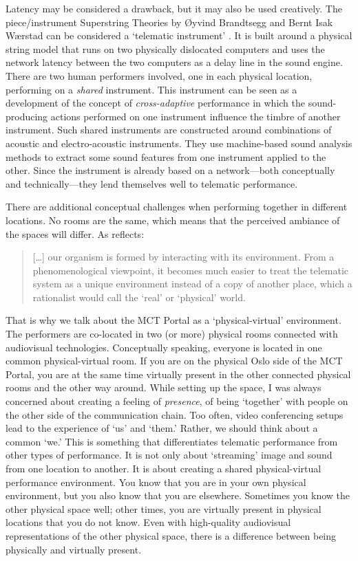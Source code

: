 Latency may be considered a drawback, but it may also be used creatively. The piece/instrument Superstring Theories by Øyvind Brandtsegg and Bernt Isak Wærstad
can be considered a `telematic instrument' \citep{brandtsegg_towards_2022}. It is built around a physical string model that runs on two physically dislocated computers and uses the network latency between the two computers as a delay line in the sound engine. There are two human performers involved, one in each physical location, performing on a \emph{shared} instrument. This instrument can be seen as a development of the concept of \emph{cross-adaptive} performance \citep{brandtsegg_working_2018} in which the sound-producing actions performed on one instrument influence the timbre of another instrument. Such shared instruments are constructed around combinations of acoustic and electro-acoustic instruments. They use machine-based sound analysis methods to extract some sound features from one instrument applied to the other. Since the instrument is already based on a network---both conceptually and technically---they lend themselves well to telematic performance.

There are additional conceptual challenges when performing together in different locations. No rooms are the same, which means that the perceived ambiance of the spaces will differ. As \citep[p.424]{braasch_telematic_2009} reflects:

\begin{quotation}
[\ldots] our organism is formed by interacting with its environment. From a phenomenological viewpoint, it becomes much easier to treat the telematic system as a unique environment instead of a copy of another place, which a rationalist would call the ‘real’ or ‘physical’ world.
\end{quotation}

That is why we talk about the MCT Portal as a `physical-virtual' environment. The performers are co-located in two (or more) physical rooms connected with audiovisual technologies. Conceptually speaking, everyone is located in one common physical-virtual room. If you are on the physical Oslo side of the MCT Portal, you are at the same time virtually present in the other connected physical rooms and the other way around. While setting up the space, I was always concerned about creating a feeling of \emph{presence}, of being `together' with people on the other side of the communication chain. Too often, video conferencing setups lead to the experience of `us' and `them.' Rather, we should think about a common `we.' This is something that differentiates telematic performance from other types of performance. It is not only about `streaming' image and sound from one location to another. It is about creating a shared physical-virtual performance environment. You know that you are in your own physical environment, but you also know that you are elsewhere. Sometimes you know the other physical space well; other times, you are virtually present in physical locations that you do not know. Even with high-quality audiovisual representations of the other physical space, there is a difference between being physically and virtually present.

